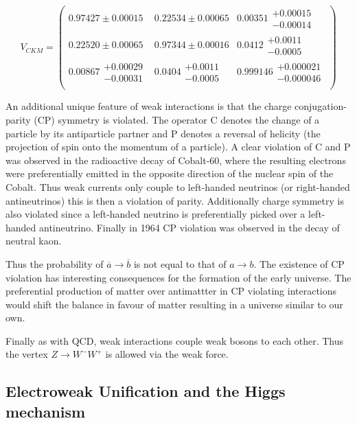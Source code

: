 \begin{equation}
\label{eq:TheoryWeakCKM}
V_{CKM}
=
\begin{pmatrix}
  0.97427\pm0.00015 & 0.22534\pm0.00065 & 0.00351\substack{+0.00015\\-0.00014} \\
  0.22520\pm0.00065 & 0.97344\pm0.00016 & 0.0412\substack{+0.0011\\-0.0005} \\
  0.00867\substack{+0.00029\\-0.00031} & 0.0404\substack{+0.0011\\-0.0005} & 0.999146\substack{+0.000021\\-0.000046} \\
\end{pmatrix}
\end{equation}

An additional unique feature of weak interactions is that the charge conjugation-parity (CP) symmetry is violated. The operator C denotes the change of a particle by its antiparticle partner and P denotes a reversal of helicity (the projection of spin onto the momentum of a particle). A clear violation of C and P was observed in the radioactive decay of Cobalt-60, where the resulting electrons were preferentially emitted in the opposite direction of the nuclear spin of the Cobalt. Thus weak currents only couple to left-handed neutrinos (or right-handed antineutrinos) this is then a violation of parity. Additionally charge symmetry is also violated since a left-handed neutrino is preferentially picked over a left-handed antineutrino. Finally in 1964 CP violation was observed in the decay of neutral kaon.

Thus the probability of $\overline{a}\rightarrow \overline{b}$ is not equal to that of $a\rightarrow b$. The existence of CP violation has interesting consequences for the formation of the early universe. The preferential production of matter over antimattter in CP violating interactions would shift the balance in favour of matter resulting in a universe similar to our own.

Finally as with QCD, weak interactions couple weak bosons to each other. Thus the vertex $Z\rightarrow W^-W^+$ is allowed via the weak force.

\subsection{Electroweak Unification and the Higgs mechanism}

